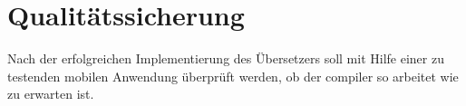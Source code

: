 \chapter{Qualitätssicherung}
Nach der erfolgreichen Implementierung des Übersetzers soll mit Hilfe einer zu testenden mobilen Anwendung überprüft werden,  ob der compiler so arbeitet wie zu erwarten ist.  
